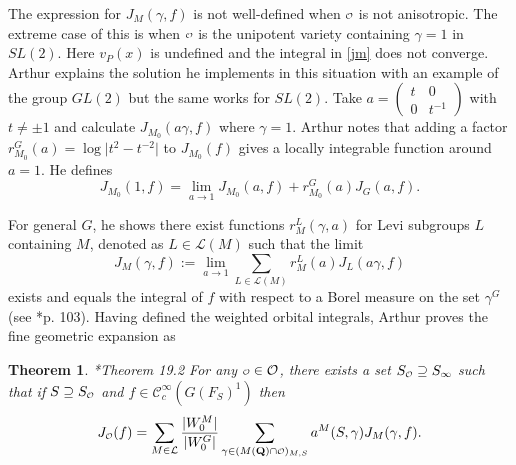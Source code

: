 \documentclass[11pt]{amsart}
\def\Q{\mathbf Q}
\def\CCC{\mathcal C}
\def\LLL{\mathcal L}
\def\O{\mathcal O}
\def\o{\scalebox{0.8}{$\scriptstyle\mathcal{O}$}}
\def\mod#1{\lvert #1 \rvert} %
\newtheorem{theorem}{Theorem}[section]
\theoremstyle{remark}
\begin{document}
The expression for $J_M(\gamma, f)$ is not well-defined when $\o$ is not anisotropic. The extreme case of this is when $\o$ is the unipotent variety containing $\gamma = 1$ in $SL(2)$. Here $v_P(x)$ is undefined and the integral in \cref{jm} does not converge. Arthur explains the solution he implements in this situation with an example of the group $GL(2)$ but the same works for $SL(2)$. Take $a = \begin{pmatrix} t & 0 \\ 0 & t^{-1} \end{pmatrix}$ with $t \neq \pm 1$ and calculate $J_{M_0}(a\gamma, f)$ where $\gamma = 1$. Arthur notes that adding a factor $r_{M_0}^G(a) = \log \mod{t^2 - t^{-2}}$ to $J_{M_0}(f)$ gives a locally integrable function around $a=1$. He defines
\begin{equation} \label{lim_orbint}
	J_{M_0}(1, f) = \lim_{a \to 1} J_{M_0}(a, f) + r_{M_0}^G(a) J_G(a, f).
\end{equation}

For general $G$, he shows there exist functions $r_M^L(\gamma, a)$ for Levi subgroups $L$ containing $M$, denoted as $L \in \LLL(M)$ such that the limit
\[ J_M(\gamma, f) := \lim_{a \to 1} \sum_{L \in \LLL(M)} r_M^L(a) J_L(a\gamma, f) \]
exists and equals the integral of $f$ with respect to a Borel measure on the set $\gamma^G$ (see \cite{clay}*{p. 103}). Having defined the weighted orbital integrals, Arthur proves the fine geometric expansion as
\begin{theorem} \cite{clay}*{Theorem 19.2}
	For any $\o \in \O$, there exists a set $S_{\o} \supseteq S_\infty$ such that if $S \supseteq S_{\o}$ and $f \in \CCC_c^\infty(G(F_S)^1)$ then
	\[ J_{\o}(f) = \sum_{M \in \LLL} \frac{\mod{W_0^M}}{\mod{W_0^G}} \sum_{\gamma \in (M(\Q)\cap \o)_{M, S}}
			a^M(S, \gamma) J_M(\gamma, f). \]
\end{theorem}
\end{document}
